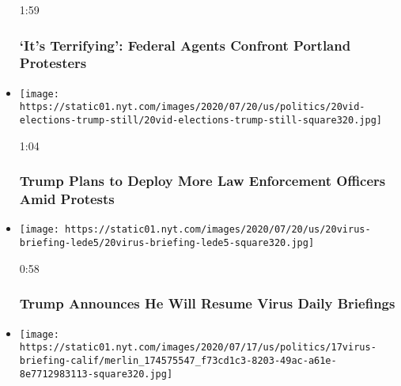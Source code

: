 \begin{itemize}
  1:59

  \hypertarget{its-terrifying-federal-agents-confront-portland-protesters}{%
  \subsubsection{`It's Terrifying': Federal Agents Confront Portland
  Protesters}\label{its-terrifying-federal-agents-confront-portland-protesters}}
\item
  \href{https://www.nytimes.com/video/us/100000007247868/trump-deploy-federal-agents.html?action=click\&module=video-series-bar\&region=header\&pgtype=Article\&playlistId=video/u-s}{}

  \texttt{[image: https://static01.nyt.com/images/2020/07/20/us/politics/20vid-elections-trump-still/20vid-elections-trump-still-square320.jpg]}

  1:04

  \hypertarget{trump-plans-to-deploy-more-law-enforcement-officers-amid-protests}{%
  \subsubsection{Trump Plans to Deploy More Law Enforcement Officers
  Amid
  Protests}\label{trump-plans-to-deploy-more-law-enforcement-officers-amid-protests}}
\item
  \href{https://www.nytimes.com/video/us/100000007247407/trump-will-resume-virus-briefings.html?action=click\&module=video-series-bar\&region=header\&pgtype=Article\&playlistId=video/u-s}{}

  \texttt{[image: https://static01.nyt.com/images/2020/07/20/us/20virus-briefing-lede5/20virus-briefing-lede5-square320.jpg]}

  0:58

  \hypertarget{trump-announces-he-will-resume-virus-daily-briefings}{%
  \subsubsection{Trump Announces He Will Resume Virus Daily
  Briefings}\label{trump-announces-he-will-resume-virus-daily-briefings}}
\item
  \href{https://www.nytimes.com/video/us/100000007244908/newsom-california-schools.html?action=click\&module=video-series-bar\&region=header\&pgtype=Article\&playlistId=video/u-s}{}

  \texttt{[image: https://static01.nyt.com/images/2020/07/17/us/politics/17virus-briefing-calif/merlin\_174575547\_f73cd1c3-8203-49ac-a61e-8e7712983113-square320.jpg]}


\end{itemize}
